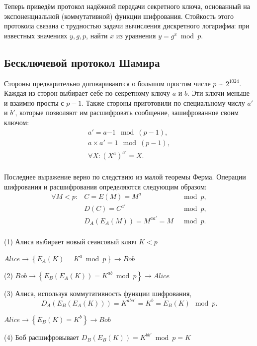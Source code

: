 Теперь приведём протокол надёжной передачи секретного ключа, основанный на экспоненциальной (коммутативной) функции шифрования. Стойкость этого протокола связана с трудностью задачи вычисления дискретного логарифма: при известных значениях $y, g, p$, найти $x$ из уравнения $y = g^x \bmod p$.

\subsection{Бесключевой протокол Шамира}\label{section-protocols-shamir}

Стороны предварительно договариваются о большом простом числе $p \sim 2^{1024}$. Каждая из сторон выбирает себе по секретному ключу $a$ и $b$. Эти ключи меньше и взаимно просты с $p-1$. Также стороны приготовили по специальному числу $a'$ и $b'$, которые позволяют им расшифровать сообщение, зашифрованное своим ключом:
\[\begin{array}{l}
a' = a{-1} \mod (p-1), \\
a \times a' = 1 \mod (p-1), \\
\forall X: (X^a)^{a'} = X. \\
\end{array}\]

Последнее выражение верно по следствию из малой теоремы Ферма. Операции шифрования и расшифрования определяются следующим образом:
\[\begin{array}{lll}
\forall M < p: & C = E( M ) = M^{a}            & \mod p, \\
               & D( C ) = C^{a'}               & \mod p, \\
               & D_A( E_A( M ) ) = M^{aa'} = M & \mod p. \\
\end{array}\]

\begin{protocol}
    \item[(1)] Алиса выбирает новый сеансовый ключ $K < p$
    \item[{}] $Alice \to \left\{ E_A \left( K \right) = K^a \bmod p \right\} \to Bob$
    \item[(2)] $Bob \to \left\{ E_B \left( E_A \left( K \right) \right) = K^{ab} \bmod p \right\} \to Alice$
    \item[(3)] Алиса, используя коммутативность функции шифрования,
	\[ D_A \left( E_B \left( E_A \left( K \right) \right) \right) = K^{aba'} = K^b = E_B \left( K \right) \mod p. \]
    \item[{}] $Alice \to \left\{ E_B \left( K \right) = K^b \right\} \to Bob$
    \item[(4)] Боб расшифровывает $D_B \left( E_B \left( K \right) \right) = K^{bb'} \bmod p = K$
\end{protocol}

